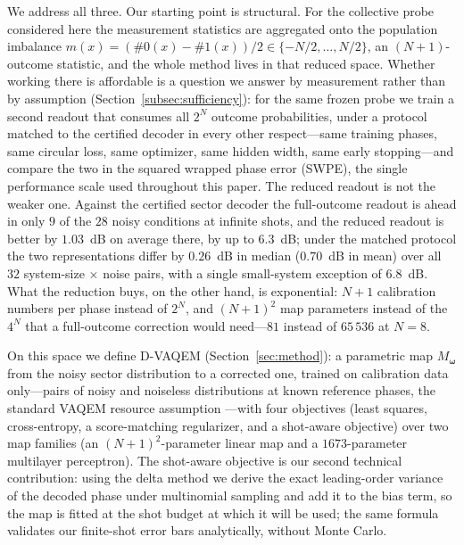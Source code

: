 \documentclass[ASNA,twocolumn]{USG}
\newcommand{\dvaqem}{D-VAQEM}
\begin{document}
We address all three.  Our starting point is structural.  For the collective
probe considered here the measurement statistics are aggregated onto the
population imbalance $m(x)=(\#0(x)-\#1(x))/2\in\{-N/2,\dots,N/2\}$, an $(N+1)$-outcome
statistic, and the whole method lives in that reduced space.  Whether working
there is affordable is a question we answer by measurement rather than by
assumption
(Section~\ref{subsec:sufficiency}): for the same frozen probe we train a second
readout that consumes all $2^N$ outcome probabilities, under a protocol matched
to the certified decoder in every other respect---same training phases, same
circular loss, same optimizer, same hidden width, same early stopping---and
compare the two in the squared wrapped phase error (SWPE), the single
performance scale used throughout this paper.  The reduced readout is not the
weaker one.  Against the certified sector decoder the full-outcome readout is
ahead in only $9$ of the $28$ noisy conditions at infinite shots, and the
reduced readout is better by $1.03$~dB on average there, by up to $6.3$~dB;
under the matched protocol the two representations differ by $0.26$~dB in median
($0.70$~dB in mean) over all $32$ system-size $\times$ noise pairs, with a
single small-system exception of $6.8$~dB.  What the reduction buys, on the
other hand, is exponential: $N+1$ calibration numbers per phase instead of
$2^N$, and $(N+1)^2$ map parameters instead of the $4^N$ that a full-outcome
correction would need---$81$ instead of $65\,536$ at $N=8$.

On this space we define \dvaqem{} (Section~\ref{sec:method}): a parametric map
$M_{\bm\omega}$ from the noisy sector distribution to a corrected one, trained on
calibration data only---pairs of noisy and noiseless distributions at known
reference phases, the standard VAQEM resource assumption
\cite{strikis2021learning}---with four objectives (least squares,
cross-entropy, a score-matching regularizer, and a
shot-aware objective) over two map families (an $(N+1)^2$-parameter linear map
and a $1673$-parameter multilayer perceptron).  The shot-aware objective is our
second technical contribution: using the delta method
\cite{vaart1998asymptotic} we derive the exact leading-order variance of the
decoded phase under multinomial sampling and add it to the bias term, so the
map is fitted at the shot budget at which it will be used; the same formula
validates our finite-shot error bars analytically, without Monte Carlo.
\end{document}

